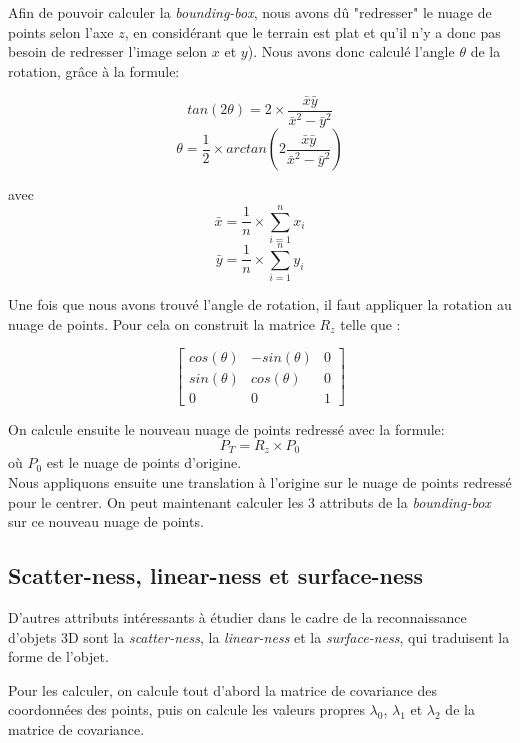 		Afin de pouvoir calculer la \emph{bounding-box}, nous avons dû "redresser" le nuage de points selon l'axe $z$, en considérant que le terrain est plat et qu'il n'y a donc pas besoin de redresser l'image selon $x$ et $y$).
		Nous avons donc calculé l'angle $\theta$ de la rotation, grâce à la formule:

		\[ tan(2 \theta) = 2 \times \frac{\bar{x}\bar{y}}{\bar{x}^2 - \bar{y}^2} \]
		\[ \theta = \frac{1}{2} \times arctan(2 \frac{\bar{x}\bar{y}}{\bar{x}^2 - \bar{y}^2}) \]

		avec \[ \bar{x} = \frac{1}{n} \times \sum_{i =1}^n{x_i} \]
		\[ \bar{y} = \frac{1}{n} \times \sum_{i =1}^n{y_i} \]

		Une fois que nous avons trouvé l'angle de rotation, il faut appliquer la rotation au nuage de points. Pour cela on construit la matrice $R_z$ telle que :

		\[\begin{bmatrix}
		   cos(\theta) & -sin(\theta) & 0 \\
		sin(\theta) & cos(\theta) & 0 \\
		0 & 0 & 1
		\end{bmatrix}\]

		On calcule ensuite le nouveau nuage de points redressé avec la formule:
		\[ P_T = R_z \times P_0\]
		où $P_0$ est le nuage de points d'origine. \\

		Nous appliquons ensuite une translation à l'origine sur le nuage de points redressé pour le centrer. On peut maintenant calculer les 3 attributs de la \emph{bounding-box} sur ce nouveau nuage de points.


	\subsection{Scatter-ness, linear-ness et surface-ness}
		D'autres attributs intéressants à étudier dans le cadre de la reconnaissance d'objets 3D sont la \emph{scatter-ness}, la \emph{linear-ness} et la \emph{surface-ness}, qui traduisent la forme de l'objet.

		Pour les calculer, on calcule tout d'abord la matrice de covariance des coordonnées des points, puis on calcule les valeurs propres $\lambda_0$, $\lambda_1$ et $\lambda_2$ de la matrice de covariance. \\

